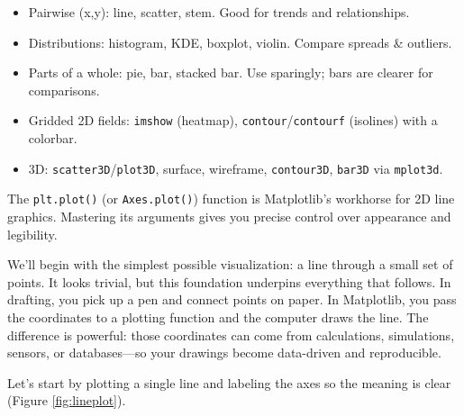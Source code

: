 \begin{itemize}
    \item Pairwise (x,y): line, scatter, stem. Good for trends and relationships.
    \item Distributions: histogram, KDE, boxplot, violin. Compare spreads \& outliers.
    \item Parts of a whole: pie, bar, stacked bar. Use sparingly; bars are clearer for comparisons.
    \item Gridded 2D fields: \texttt{imshow} (heatmap), \texttt{contour}/\texttt{contourf} (isolines) with a colorbar.
    \item 3D: \texttt{scatter3D}/\texttt{plot3D}, surface, wireframe, \texttt{contour3D}, \texttt{bar3D} via \texttt{mplot3d}.
\end{itemize}


The \texttt{plt.plot()} (or \texttt{Axes.plot()}) function is Matplotlib's workhorse for 2D line graphics. Mastering its arguments gives you precise control over appearance and legibility.


We’ll begin with the simplest possible visualization: a line through a small set of points. It looks trivial, but this foundation underpins everything that follows. In drafting, you pick up a pen and connect points on paper. In Matplotlib, you pass the coordinates to a plotting function and the computer draws the line. The difference is powerful: those coordinates can come from calculations, simulations, sensors, or databases—so your drawings become data-driven and reproducible.

Let’s start by plotting a single line and labeling the axes so the meaning is clear (Figure \ref{fig:lineplot}).


